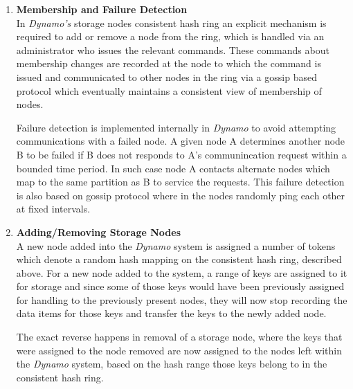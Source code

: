 \documentclass[12pt, a4paper]{article}
\begin{document}
\begin{enumerate}
\item \textbf{Membership and Failure Detection}\\
In \textit{Dynamo's} storage nodes consistent hash ring an explicit mechanism is required to add or remove a node from the ring, which is handled via an administrator who issues the relevant commands. These commands about membership changes are recorded at the node to which the command is issued and communicated to other nodes in the ring via a gossip based protocol which eventually maintains a consistent view of membership of nodes.\par

Failure detection is implemented internally in \textit{Dynamo}\cite{DeCandia:2007:DAH:1294261.1294281} to avoid attempting communications with a failed node. A given node A determines another node B to be failed if B does not responds to A's communincation request within a bounded time period. In such case node A contacts alternate nodes which map to the same partition as B to service the requests. This failure detection is also based on gossip protocol where in the nodes randomly ping each other at fixed intervals.

\item \textbf{Adding/Removing Storage Nodes}\\
A new node added into the \textit{Dynamo}\cite{DeCandia:2007:DAH:1294261.1294281} system is assigned a number of tokens which denote a random hash mapping on the consistent hash ring, described above. For a new node added to the system, a range of keys are assigned to it for storage and since some of those keys would have been previously assigned for handling to the previously present nodes, they will now stop recording the data items for those keys and transfer the keys to the newly added node.\par

The exact reverse happens in removal of a storage node, where the keys that were assigned to the node removed are now assigned to the nodes left within the \textit{Dynamo}\cite{DeCandia:2007:DAH:1294261.1294281} system, based on the hash range those keys belong to in the consistent hash ring.
\end{enumerate}



\end{document}
